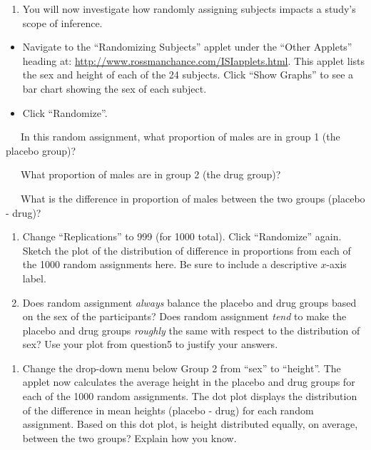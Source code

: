 \documentclass[
]{report}
\providecommand{\tightlist}{%
  \setlength{\itemsep}{0pt}\setlength{\parskip}{0pt}}
\begin{document}
\begin{enumerate}
\def\labelenumi{\arabic{enumi}.}
\setcounter{enumi}{3}
\tightlist
\item
  You will now investigate how randomly assigning subjects impacts a study's scope of inference.
\end{enumerate}

\begin{itemize}
\item
  Navigate to the ``Randomizing Subjects'' applet under the ``Other Applets'' heading at: \url{http://www.rossmanchance.com/ISIapplets.html}. This applet lists the sex and height of each of the 24 subjects. Click ``Show Graphs'' to see a bar chart showing the sex of each subject.
\item
  Click ``Randomize''.
\end{itemize}

~~~In this random assignment, what proportion of males are in group 1 (the placebo group)?

\vspace{0.1in}

~~~What proportion of males are in group 2 (the drug group)?

\vspace{0.1in}

~~~What is the difference in proportion of males between the two groups (placebo - drug)?

\vspace{0.1in}

\begin{enumerate}
\def\labelenumi{\arabic{enumi}.}
\setcounter{enumi}{4}
\item
  Change ``Replications'' to 999 (for 1000 total). Click ``Randomize'' again. Sketch the plot of the distribution of difference in proportions from each of the 1000 random assignments here. Be sure to include a descriptive \(x\)-axis label.
  \vspace{1.25in}
\item
  Does random assignment \emph{always} balance the placebo and drug groups based on the sex of the participants? Does random assignment \emph{tend} to make the placebo and drug groups \emph{roughly} the same with respect to the distribution of sex? Use your plot from question5 to justify your answers.
\end{enumerate}

\vspace{0.8in}

\begin{enumerate}
\def\labelenumi{\arabic{enumi}.}
\setcounter{enumi}{6}
\tightlist
\item
  Change the drop-down menu below Group 2 from ``sex'' to ``height''. The applet now calculates the average height in the placebo and drug groups for each of the 1000 random assignments. The dot plot displays the distribution of the difference in mean heights (placebo - drug) for each random assignment. Based on this dot plot, is height distributed equally, on average, between the two groups? Explain how you know.
  \vspace{0.5in}
\end{enumerate}
\end{document}
